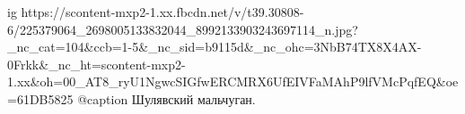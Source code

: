  
 
 
 
 

\ifcmt
  ig https://scontent-mxp2-1.xx.fbcdn.net/v/t39.30808-6/225379064_2698005133832044_8992133903243697114_n.jpg?_nc_cat=104&ccb=1-5&_nc_sid=b9115d&_nc_ohc=3NbB74TX8X4AX-0Frkk&_nc_ht=scontent-mxp2-1.xx&oh=00_AT8_ryU1NgwcSIGfwERCMRX6UfEIVFaMAhP9lfVMcPqfEQ&oe=61DB5825
  @caption Шулявский мальчуган.
\fi
